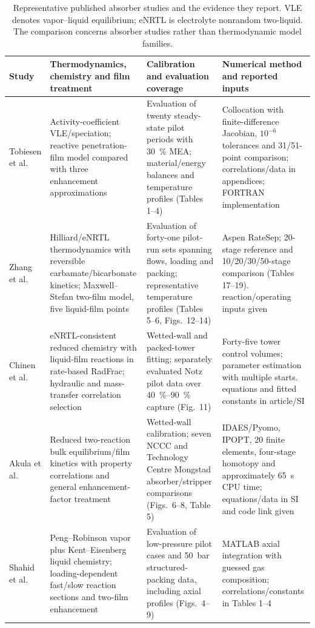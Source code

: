 \begin{table}[pos=htbp]
\centering
\small
\caption{Representative published absorber studies and the evidence they report. VLE denotes vapor--liquid equilibrium; eNRTL is electrolyte nonrandom two-liquid. The comparison concerns absorber studies rather than thermodynamic model families.}
\label{tab:absorber-literature-comparison}
\begin{tabularx}{\textwidth}{@{}>{\raggedright\arraybackslash}p{}*{3}{>{\raggedright\arraybackslash}X}@{}}
\toprule
Study & Thermodynamics, chemistry and film treatment & Calibration and evaluation coverage & Numerical method and reported inputs \\
\midrule
Tobiesen et al.\ \cite{Tobiesen2007} & Activity-coefficient VLE/speciation; reactive penetration-film model compared with three enhancement approximations & Evaluation of twenty steady-state pilot periods with \qty{30}{\percent} MEA; material/energy balances and temperature profiles (Tables 1--4) & Collocation with finite-difference Jacobian, \(10^{-6}\) tolerances and 31/51-point comparison; correlations/data in appendices; FORTRAN implementation \\
\addlinespace
Zhang et al.\ \cite{Zhang2009} & Hilliard/eNRTL thermodynamics with reversible carbamate/bicarbonate kinetics; Maxwell--Stefan two-film model, five liquid-film points & Evaluation of forty-one pilot-run sets spanning flows, loading and packing; representative temperature profiles (Tables 5--6, Figs.\ 12--14) & Aspen RateSep; 20-stage reference and 10/20/30/50-stage comparison (Tables 17--19). reaction/operating inputs given \\
\addlinespace
Chinen et al.\ \cite{Chinen2018} & eNRTL-consistent reduced chemistry with liquid-film reactions in rate-based RadFrac; hydraulic and mass-transfer correlation selection & Wetted-wall and packed-tower fitting; separately evaluated Notz pilot data over \qtyrange{40}{90}{\percent} capture (Fig.\ 11) & Forty-five tower control volumes; parameter estimation with multiple starts. equations and fitted constants in article/SI \\
\addlinespace
Akula et al.\ \cite{Akula2021} & Reduced two-reaction bulk equilibrium/film kinetics with property correlations and general enhancement-factor treatment & Wetted-wall calibration; seven NCCC and Technology Centre Mongstad absorber/stripper comparisons (Figs.\ 6--8, Table 5) & IDAES/Pyomo, IPOPT, 20 finite elements, four-stage homotopy and approximately \qty{65}{s} CPU time; equations/data in SI and code link given \\
\addlinespace
Shahid et al.\ \cite{Shahid2019} & Peng--Robinson vapor plus Kent--Eisenberg liquid chemistry; loading-dependent fast/slow reaction sections and two-film enhancement & Evaluation of low-pressure pilot cases and \qty{50}{bar} structured-packing data, including axial profiles (Figs.\ 4--9) & MATLAB axial integration with guessed gas composition; correlations/constants in Tables 1--4 \\
\bottomrule
\end{tabularx}
\end{table}

